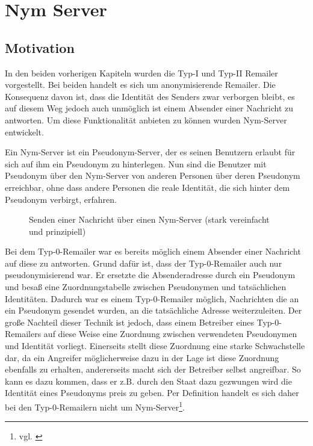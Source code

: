 \chapter{Nym Server}

\section{Motivation}
In den beiden vorherigen Kapiteln wurden die Typ-I und Typ-II Remailer vorgestellt. Bei beiden handelt es sich um anonymisierende Remailer. Die Konsequenz davon ist, dass die Identität des Senders zwar verborgen bleibt, es auf diesem Weg jedoch auch unmöglich ist einem Absender einer Nachricht zu antworten. Um diese Funktionalität anbieten zu können wurden Nym-Server entwickelt.

Ein Nym-Server ist ein Pseudonym-Server, der es seinen Benutzern erlaubt für sich auf ihm ein Pseudonym zu hinterlegen. Nun sind die Benutzer mit Pseudonym über den Nym-Server von anderen Personen über deren Pseudonym erreichbar, ohne dass andere Personen die reale Identität, die sich hinter dem Pseudonym verbirgt, erfahren.

\begin{figure}
	\centering
	\begin{sequencediagram}
	\end{sequencediagram}
	\caption{Senden einer Nachricht über einen Nym-Server (stark vereinfacht und prinzipiell)}
\end{figure}

Bei dem Typ-0-Remailer war es bereits möglich einem Absender einer Nachricht auf diese zu antworten. Grund dafür ist, dass der Typ-0-Remailer auch nur pseudonymisierend war. Er ersetzte die Absenderadresse durch ein Pseudonym und besaß eine Zuordnungstabelle zwischen Pseudonymen und tatsächlichen Identitäten. Dadurch war es einem Typ-0-Remailer möglich, Nachrichten die an ein Pseudonym gesendet wurden, an die tatsächliche Adresse weiterzuleiten. Der große Nachteil dieser Technik ist jedoch, dass einem Betreiber eines Typ-0-Remailers auf diese Weise eine Zuordnung zwischen verwendeten Pseudonymen und Identität vorliegt. Einerseits stellt diese Zuordnung eine starke Schwachstelle dar, da ein Angreifer möglicherweise dazu in der Lage ist diese Zuordnung ebenfalls zu erhalten, andererseits macht sich der Betreiber selbst angreifbar. So kann es dazu kommen, dass er z.B. durch den Staat dazu gezwungen wird die Identität eines Pseudonyms preis zu geben. Per Definition handelt es sich daher bei den Typ-0-Remailern nicht um Nym-Server\footnote{vgl. \cite{nymdefinition}}.


